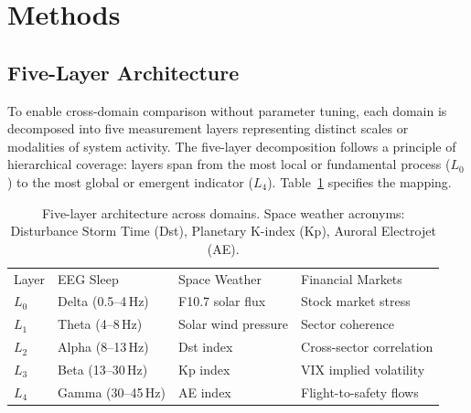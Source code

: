 \documentclass[aip,cha,reprint,amsmath,amssymb,final]{revtex4-2}
\begin{document}
\section{Methods}

\subsection{Five-Layer Architecture}

To enable cross-domain comparison without parameter tuning, each domain is decomposed into five measurement layers representing distinct scales or modalities of system activity. The five-layer decomposition follows a principle of hierarchical coverage: layers span from the most local or fundamental process ($L_0$) to the most global or emergent indicator ($L_4$). Table~\ref{tab:layers} specifies the mapping.

\begin{table}[!htbp]
\caption[Five-layer architecture mapping for EEG, space weather, and financial domains]{\label{tab:layers}Five-layer architecture across domains. Space weather acronyms: Disturbance Storm Time (Dst), Planetary K-index (Kp), Auroral Electrojet (AE).}
\begin{ruledtabular}
\begin{tabular}{lp{2.0cm}p{2.0cm}p{2.1cm}}
Layer & EEG Sleep & Space Weather & Financial Markets \\
$L_0$ & Delta (0.5--4\,Hz) & F10.7 solar flux & Stock market stress \\
$L_1$ & Theta (4--8\,Hz) & Solar wind pressure & Sector coherence \\
$L_2$ & Alpha (8--13\,Hz) & Dst index & Cross-sector correlation \\
$L_3$ & Beta (13--30\,Hz) & Kp index & VIX implied volatility \\
$L_4$ & Gamma (30--45\,Hz) & AE index & Flight-to-safety flows \\
\end{tabular}
\end{ruledtabular}
\end{table}
\end{document}

